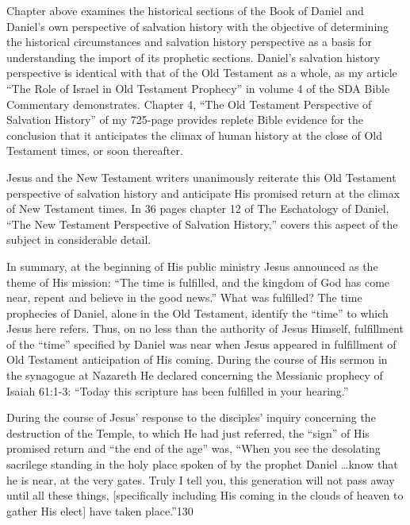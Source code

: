 Chapter  above examines the historical sections of the Book of Daniel and
Daniel's own perspective of salvation history with the objective of
determining the historical circumstances and salvation history perspective
as a basis for understanding the import of its prophetic sections. Daniel's
salvation history perspective is identical with that of the Old Testament as
a whole, as my article ``The Role of Israel in Old Testament Prophecy'' in
volume 4 of the SDA Bible Commentary demonstrates. Chapter 4, ``The Old Testament
Perspective of Salvation History'' of my 725-page 
provides replete Bible evidence for the
conclusion that it anticipates the climax of human history at the close of
Old Testament times, or soon thereafter.

Jesus and the New Testament writers unanimously reiterate this Old Testament
perspective of salvation history and anticipate His promised return at the
climax of New Testament times. In 36 pages chapter 12 of The Eschatology of 
Daniel, ``The New Testament Perspective of Salvation History,'' covers this
aspect of the subject in considerable detail.

In summary, at the beginning of His public ministry Jesus announced as the
theme of His mission: ``The time is fulfilled, and the kingdom of God has
come near, repent and believe in the good news.'' What was fulfilled? The
time prophecies of Daniel, alone in the Old Testament, identify the ``time''
to which Jesus here refers. Thus, on no less than the authority of Jesus
Himself, fulfillment of the ``time'' specified by Daniel was near when Jesus
appeared in fulfillment of Old Testament anticipation of His coming. During
the course of His sermon in the synagogue at Nazareth He declared concerning
the Messianic prophecy of Isaiah 61:1-3: ``Today this scripture has been
fulfilled in your hearing.''

During the course of Jesus' response to the disciples' inquiry concerning
the destruction of the Temple, to which He had just referred, the ``sign'' of
His promised return and ``the end of the age'' was, ``When you see the
desolating sacrilege standing in the holy place spoken of by the prophet
Daniel \ldots know that he is near, at the very gates. Truly I tell you, this
generation will not pass away until all these things, [specifically
including His coming in the clouds of heaven to gather His elect] have taken
place.''130


